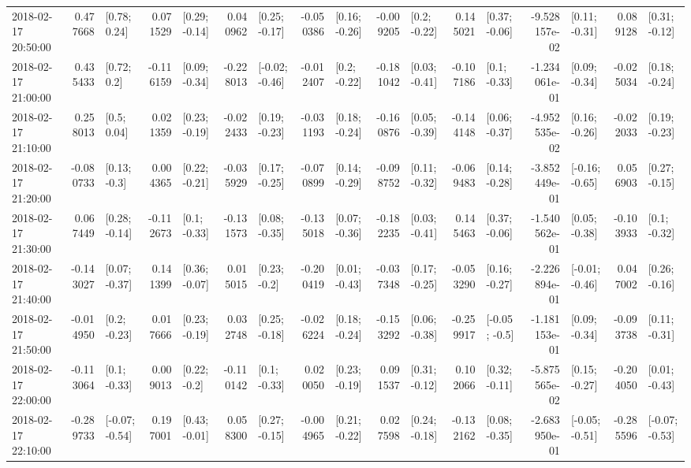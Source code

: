 \begin{tabular}{lrlrlrlrlrlrlrlrl}
2018-02-17 20:50:00 &  0.477668 &    [0.78; 0.24] &  0.071529 &   [0.29; -0.14] &  0.040962 &   [0.25; -0.17] & -0.050386 &   [0.16; -0.26] & -0.009205 &    [0.2; -0.22] &  0.145021 &   [0.37; -0.06] & -9.528157e-02 &   [0.11; -0.31] &  0.089128 &   [0.31; -0.12] \\
2018-02-17 21:00:00 &  0.435433 &     [0.72; 0.2] & -0.116159 &   [0.09; -0.34] & -0.228013 &  [-0.02; -0.46] & -0.012407 &    [0.2; -0.22] & -0.181042 &   [0.03; -0.41] & -0.107186 &    [0.1; -0.33] & -1.234061e-01 &   [0.09; -0.34] & -0.025034 &   [0.18; -0.24] \\
2018-02-17 21:10:00 &  0.258013 &     [0.5; 0.04] &  0.021359 &   [0.23; -0.19] & -0.022433 &   [0.19; -0.23] & -0.031193 &   [0.18; -0.24] & -0.160876 &   [0.05; -0.39] & -0.144148 &   [0.06; -0.37] & -4.952535e-02 &   [0.16; -0.26] & -0.022033 &   [0.19; -0.23] \\
2018-02-17 21:20:00 & -0.080733 &    [0.13; -0.3] &  0.004365 &   [0.22; -0.21] & -0.035929 &   [0.17; -0.25] & -0.070899 &   [0.14; -0.29] & -0.098752 &   [0.11; -0.32] & -0.069483 &   [0.14; -0.28] & -3.852449e-01 &  [-0.16; -0.65] &  0.056903 &   [0.27; -0.15] \\
2018-02-17 21:30:00 &  0.067449 &   [0.28; -0.14] & -0.112673 &    [0.1; -0.33] & -0.131573 &   [0.08; -0.35] & -0.135018 &   [0.07; -0.36] & -0.182235 &   [0.03; -0.41] &  0.145463 &   [0.37; -0.06] & -1.540562e-01 &   [0.05; -0.38] & -0.103933 &    [0.1; -0.32] \\
2018-02-17 21:40:00 & -0.143027 &   [0.07; -0.37] &  0.141399 &   [0.36; -0.07] &  0.015015 &    [0.23; -0.2] & -0.200419 &   [0.01; -0.43] & -0.037348 &   [0.17; -0.25] & -0.053290 &   [0.16; -0.27] & -2.226894e-01 &  [-0.01; -0.46] &  0.047002 &   [0.26; -0.16] \\
2018-02-17 21:50:00 & -0.014950 &    [0.2; -0.23] &  0.017666 &   [0.23; -0.19] &  0.032748 &   [0.25; -0.18] & -0.026224 &   [0.18; -0.24] & -0.153292 &   [0.06; -0.38] & -0.259917 &   [-0.05; -0.5] & -1.181153e-01 &   [0.09; -0.34] & -0.093738 &   [0.11; -0.31] \\
2018-02-17 22:00:00 & -0.113064 &    [0.1; -0.33] &  0.009013 &    [0.22; -0.2] & -0.110142 &    [0.1; -0.33] &  0.020050 &   [0.23; -0.19] &  0.091537 &   [0.31; -0.12] &  0.102066 &   [0.32; -0.11] & -5.875565e-02 &   [0.15; -0.27] & -0.204050 &   [0.01; -0.43] \\
2018-02-17 22:10:00 & -0.289733 &  [-0.07; -0.54] &  0.197001 &   [0.43; -0.01] &  0.058300 &   [0.27; -0.15] & -0.004965 &   [0.21; -0.22] &  0.027598 &   [0.24; -0.18] & -0.132162 &   [0.08; -0.35] & -2.683950e-01 &  [-0.05; -0.51] & -0.285596 &  [-0.07; -0.53] \\

\end{tabular}
